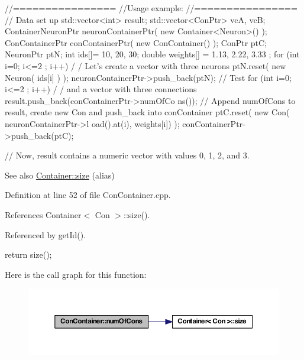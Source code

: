 \begin{DoxyCode}
  //================
  //Usage example:
  //================
        // Data set up
                                std::vector<int> result;
                                std::vector<ConPtr> vcA, vcB;
                                ContainerNeuronPtr      neuronContainerPtr( new 
      Container<Neuron>() );
                                ConContainerPtr conContainerPtr( new 
      ConContainer() );
                                ConPtr  ptC;
                                NeuronPtr ptN;
                                int ids[]= {10, 20, 30};
                                double weights[] = {1.13, 2.22, 3.33 };
                                for (int i=0; i<=2 ; i++) {                             /
      / Let's create a vector with three neurons
                                        ptN.reset( new Neuron( ids[i] ) );
                                        neuronContainerPtr->push_back(ptN);
                                }
        // Test
                                for (int i=0; i<=2 ; i++) {                             /
      / and a vector with three connections
                                        result.push_back(conContainerPtr->numOfCo
      ns());          // Append numOfCons to result, create new Con and push_back into 
      conContainer
                                        ptC.reset( new Con( neuronContainerPtr->l
      oad().at(i), weights[i]) );
                                        conContainerPtr->push_back(ptC);
                                }

        // Now, result contains a numeric vector with values 0, 1, 2, and 3.
\end{DoxyCode}


\begin{DoxySeeAlso}{See also}
\hyperlink{class_container_a359f34bc418575b474184cbe3f33527e}{Container::size} (alias) 
\end{DoxySeeAlso}


Definition at line 52 of file ConContainer.cpp.



References Container$<$ Con $>$::size().



Referenced by getId().


\begin{DoxyCode}
{
  return size();
}
\end{DoxyCode}


Here is the call graph for this function:
\nopagebreak
\begin{figure}[H]
\begin{center}
\leavevmode
\includegraphics[width=376pt]{class_con_container_a8895e2c10e223e9950028f595588b9fe_cgraph}
\end{center}
\end{figure}




